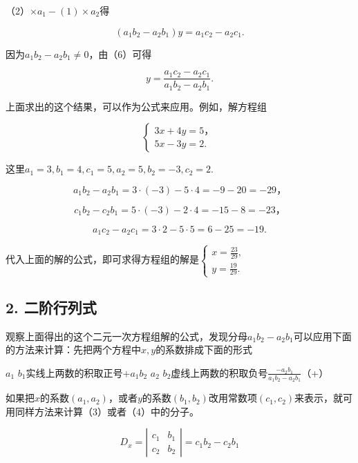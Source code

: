（2）\(\times a_{1} - (1) \times a_{2}\)得

\[
(a _ {1} b _ {2} - a _ {2} b _ {1}) y = a _ {1} c _ {2} - a _ {2} c _ {1}. \tag{6}
\]

因为\(a_{1}b_{2} - a_{2}b_{1}\neq 0\)，由（6）可得

\[
y = \frac{a _ {1} c _ {2} - a _ {2} c _ {1}}{a _ {1} b _ {2} - a _ {2} b _ {1}}.
\]

上面求出的这个结果，可以作为公式来应用。例如，解方程组

\[
\left\{ \begin{array}{l} 3 x + 4 y = 5\text{，} \\ 5 x - 3 y = 2. \end{array} \right.
\]

这里\(a_1 = 3, b_1 = 4, c_1 = 5, a_2 = 5, b_2 = -3, c_2 = 2.\)

\[
a _ {1} b _ {2} - a _ {2} b _ {1} = 3 \cdot (- 3) - 5 \cdot 4 = - 9 - 20 = - 29\text{，}
\]

\[
c _ {1} b _ {2} - c _ {2} b _ {1} = 5 \cdot (- 3) - 2 \cdot 4 = - 15 - 8 = - 23\text{，}
\]

\[
a _ {1} c _ {2} - a _ {2} c _ {1} = 3 \cdot 2 - 5 \cdot 5 = 6 - 25 = - 19.
\]

代入上面的解的公式，即可求得方程组的解是\(\left\{ \begin{array}{l} x = \frac{23}{29}, \\ y = \frac{19}{29}. \end{array} \right.\)

\subsection{2. 二阶行列式}

观察上面得出的这个二元一次方程组解的公式，发现分母\(a_1b_2 - a_2b_1\)可以应用下面的方法来计算：先把两个方程中\(x, y\)的系数排成下面的形式

\(a_{1}\) \(b_{1}\)实线上两数的积取正号\(+a_{1}b_{2}\) \(a_{2}\) \(b_{2}\)虚线上两数的积取负号\(\frac{-a_{2}b_{1}}{a_{1}b_{2}-a_{2}b_{1}}\)（+）

如果把\(x\)的系数\((a_{1}, a_{2})\)，或者\(y\)的系数\((b_{1}, b_{2})\)改用常数项\((c_{1}, c_{2})\)来表示，就可用同样方法来计算（3）或者（4）中的分子。

\[
D_x = \left|\begin{array}{cc}c_1 & b_1\\c_2 & b_2\end{array}\right| = c_1b_2 - c_2b_1
\]

